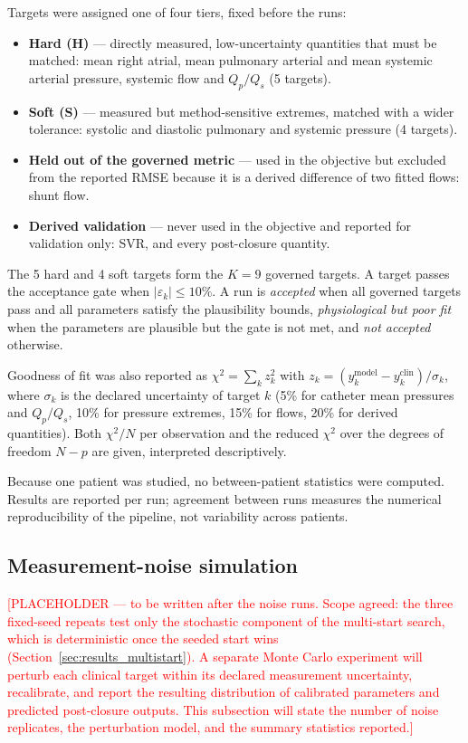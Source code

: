 Targets were assigned one of four tiers, fixed before the runs:
\begin{itemize}[leftmargin=1.5em]
\item \textbf{Hard (H)} --- directly measured, low-uncertainty quantities that must be matched: mean right atrial, mean pulmonary arterial and mean systemic arterial pressure, systemic flow and $Q_p/Q_s$ (5 targets).
\item \textbf{Soft (S)} --- measured but method-sensitive extremes, matched with a wider tolerance: systolic and diastolic pulmonary and systemic pressure (4 targets).
\item \textbf{Held out of the governed metric} --- used in the objective but excluded from the reported RMSE because it is a derived difference of two fitted flows: shunt flow.
\item \textbf{Derived validation} --- never used in the objective and reported for validation only: SVR, and every post-closure quantity.
\end{itemize}
The 5 hard and 4 soft targets form the $K = 9$ governed targets. A target passes the acceptance gate when $\lvert\varepsilon_k\rvert \le 10\%$. A run is \emph{accepted} when all governed targets pass and all parameters satisfy the plausibility bounds, \emph{physiological but poor fit} when the parameters are plausible but the gate is not met, and \emph{not accepted} otherwise.

Goodness of fit was also reported as $\chi^2 = \sum_k z_k^2$ with $z_k = (y_k^{\mathrm{model}} - y_k^{\mathrm{clin}})/\sigma_k$, where $\sigma_k$ is the declared uncertainty of target $k$ (5\% for catheter mean pressures and $Q_p/Q_s$, 10\% for pressure extremes, 15\% for flows, 20\% for derived quantities). Both $\chi^2/N$ per observation and the reduced $\chi^2$ over the degrees of freedom $N - p$ are given, interpreted descriptively.

Because one patient was studied, no between-patient statistics were computed. Results are reported per run; agreement between runs measures the numerical reproducibility of the pipeline, not variability across patients.

\subsection{Measurement-noise simulation}
\label{sec:noise}
\textcolor{red}{[PLACEHOLDER --- to be written after the noise runs. Scope agreed: the three fixed-seed repeats test only the stochastic component of the multi-start search, which is deterministic once the seeded start wins (Section~\ref{sec:results_multistart}). A separate Monte Carlo experiment will perturb each clinical target within its declared measurement uncertainty, recalibrate, and report the resulting distribution of calibrated parameters and predicted post-closure outputs. This subsection will state the number of noise replicates, the perturbation model, and the summary statistics reported.]}


